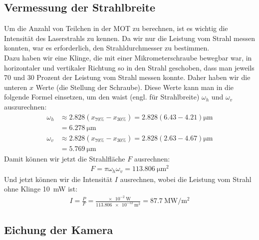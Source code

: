 \documentclass[12pt, a4paper]{article}
\begin{document}
  \subsection{Vermessung der Strahlbreite}
 Um die Anzahl von Teilchen in der MOT zu berechnen, ist es wichtig die Intensität des Laserstrahls zu kennen. Da wir nur die Leistung vom Strahl messen konnten, war es erforderlich, den Strahldurchmesser zu bestimmen.\\
 Dazu haben wir eine Klinge, die mit einer Mikrometerschraube bewegbar war, in horizontaler und vertikaler Richtung so in den Strahl geschoben, dass man jeweils 70 und 30 Prozent der Leistung vom Strahl messen konnte. Daher haben wir die unteren $x$ Werte (die Stellung der Schraube). Diese Werte kann man in die folgende Formel einsetzen, um den waist (engl. für Strahlbreite) $\omega_h$ und $\omega_v$ auszurechnen:
  \begin{align*}
  \omega_h & \approx 2.828(x_{70\%}-x_{30\%})
  =2.828(6.43-4.21) \si{\micro\m}\\
  &=\SI{6.278}{\micro\m}\\
  \omega_v &\approx 2.828(x_{70\%}-x_{30\%})=2.828(2.63-4.67) \si{\micro\m}\\&=\SI{5.769}{\micro\m}
   \end{align*}
   Damit können wir jetzt die Strahlfläche $F$ ausrechnen:
   \begin{align*}
   F=\pi \omega_h \omega_v =\SI{113.806}{\micro\m^2}
   \end{align*}
   Und jetzt können wir die Intensität $I$ ausrechnen, wobei die Leistung vom Strahl ohne Klinge \SI{10} {\mW} ist:
   \begin{align*}
   I=\frac{P}{F}=\frac{\SI{e-2}{\W}}{\SI{113.806e-12}{\m^2}}=\SI{87.7}{\mega\W\per\square\m}
   \end{align*}
  \subsection{Eichung der Kamera}
  \label{eichung}
\end{document}
